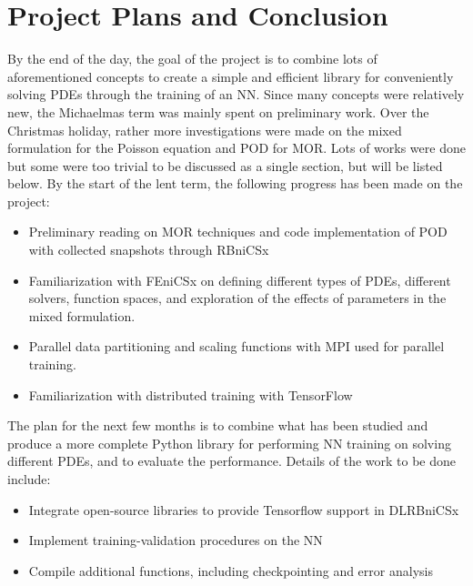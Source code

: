 \section{Project Plans and Conclusion}

By the end of the day, the goal of the project is to combine lots of aforementioned concepts to create a simple and efficient library for conveniently solving PDEs through the training of an NN. Since many concepts were relatively new, the Michaelmas term was mainly spent on preliminary work. Over the Christmas holiday, rather more investigations were made on the mixed formulation for the Poisson equation and POD for MOR. Lots of works were done but some were too trivial to be discussed as a single section, but will be listed below. By the start of the lent term, the following progress has been made on the project:

\begin{itemize}
    \item Preliminary reading on MOR techniques and code implementation of POD with collected snapshots through RBniCSx
    \item Familiarization with FEniCSx on defining different types of PDEs, different solvers, function spaces, and exploration of the effects of parameters in the mixed formulation.
    \item Parallel data partitioning and scaling functions with MPI used for parallel training. 
    \item Familiarization with distributed training with TensorFlow
    
\end{itemize}

The plan for the next few months is to combine what has been studied and produce a more complete Python library for performing NN training on solving different PDEs, and to evaluate the performance. Details of the work to be done include:

\begin{itemize}
    \item Integrate open-source libraries to provide Tensorflow support in DLRBniCSx
    \item Implement training-validation procedures on the NN
    \item Compile additional functions, including checkpointing and error analysis
\end{itemize}

